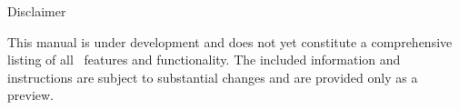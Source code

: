 \newpage

{\Huge 
\vspace*{0.5cm}
\noindent
Disclaimer
} \newline
\vspace*{0.25cm}

\noindent
{\large
This manual is under development and does not yet constitute a comprehensive listing of
all \BornAgain\ features and functionality. 
The included information and instructions are subject to substantial changes and
are provided only as a preview.
}
